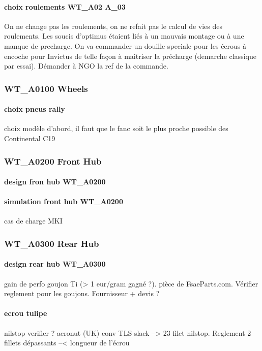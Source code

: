			\paragraph{choix roulements WT\_A02 A\_03} On ne change pas les roulements, on ne refait pas le calcul de vies des roulements. Les soucis d'optimus étaient liés à un mauvais montage ou à une manque de precharge. On va commander un douille speciale pour les écrous à encoche pour Invictus de telle façon à maitriser la précharge (demarche classique par essai). Démander à NGO la ref de la commande.
		\subsubsection*{WT\_A0100 Wheels} 
 \par 
			\paragraph{choix pneus rally} choix modèle d'abord, il faut que le fanc soit le plus proche possible des Continental C19
		\subsubsection*{WT\_A0200 Front Hub} 
 \par 
			\paragraph{design fron hub WT\_A0200} 
			\paragraph{simulation front hub WT\_A0200} cas de charge MKI

		\subsubsection*{WT\_A0300 Rear Hub} 
 \par 
			\paragraph{design rear hub WT\_A0300} gain de perfo goujon Ti (> 1 eur/gram gagné ?). pièce de FsaeParts.com. Vérifier reglement pour les goujons. Fournisseur + devis ?
			\paragraph{ecrou tulipe} nilstop verifier ? aeronut (UK) conv TLS slack --> 23 filet nilstop. Reglement 2 fillets dépassants --< longueur de l'écrou

